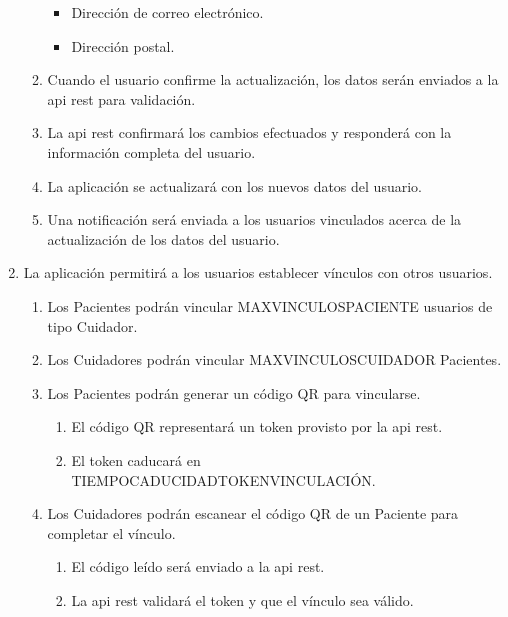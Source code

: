 \begin{enumerate}[label*=RGU \arabic*.]
\begin{enumerate}[label*=\arabic*.]
\begin{itemize}
            \item Dirección de correo electrónico.
            \item Dirección postal.
        \end{itemize}
        \item Cuando el usuario confirme la actualización, los datos serán enviados a la \acrshort{api} \acrshort{rest} para validación.
        \item La \acrshort{api} \acrshort{rest} confirmará los cambios efectuados y responderá con la información completa del usuario.
        \item La aplicación se actualizará con los nuevos datos del usuario.
        \item \label{req:noti_actualizar} Una notificación será enviada a los usuarios vinculados acerca de la actualización de los datos del usuario.
    \end{enumerate}
    \item La aplicación permitirá a los usuarios establecer vínculos con otros usuarios.
    \begin{enumerate}[label*=\arabic*.]
        \item Los Pacientes podrán vincular MAX\textunderscore VINCULOS\textunderscore PACIENTE usuarios de tipo Cuidador.
        \item Los Cuidadores podrán vincular MAX\textunderscore VINCULOS\textunderscore CUIDADOR Pacientes.
        \item \label{req:vinculo_paciente} Los Pacientes podrán generar un código QR para vincularse.
        \begin{enumerate}[label*=\arabic*.]
            \item El código QR representará un token provisto por la \acrshort{api} \acrshort{rest}.
            \item El token caducará en TIEMPO\textunderscore CADUCIDAD\textunderscore TOKEN\textunderscore VINCULACIÓN.
        \end{enumerate}
        \item \label{req:vinculo_cuidador} Los Cuidadores podrán escanear el código QR de un Paciente para completar el vínculo.
        \begin{enumerate}[label*=\arabic*.]
            \item El código leído será enviado a la \acrshort{api} \acrshort{rest}.
            \item La \acrshort{api} \acrshort{rest} validará el token y que el vínculo sea válido.
            \begin{enumerate}[label*=\arabic*.]

\end{enumerate}
\end{enumerate}
\end{enumerate}
\end{enumerate}
